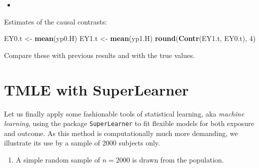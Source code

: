 \documentclass[
]{book}
\newenvironment{Shaded}{\begin{snugshade}}{\end{snugshade}}
\newcommand{\DecValTok}[1]{\textcolor[rgb]{0.00,0.00,0.81}{#1}}
\newcommand{\FunctionTok}[1]{\textcolor[rgb]{0.13,0.29,0.53}{\textbf{#1}}}
\newcommand{\NormalTok}[1]{#1}
\newcommand{\OtherTok}[1]{\textcolor[rgb]{0.56,0.35,0.01}{#1}}
\newcommand{\SpecialCharTok}[1]{\textcolor[rgb]{0.81,0.36,0.00}{\textbf{#1}}}
\providecommand{\tightlist}{%
  \setlength{\itemsep}{0pt}\setlength{\parskip}{0pt}}
\begin{document}
\begin{Shaded}
\end{Shaded}

\begin{itemize}
\tightlist
\item
\end{itemize}

Estimates of the causal contrasts:

\begin{Shaded}
\begin{Highlighting}[]
\NormalTok{EY0.t }\OtherTok{\textless{}{-}} \FunctionTok{mean}\NormalTok{(yp0.H)}
\NormalTok{EY1.t }\OtherTok{\textless{}{-}} \FunctionTok{mean}\NormalTok{(yp1.H)}
\FunctionTok{round}\NormalTok{(}\FunctionTok{Contr}\NormalTok{(EY1.t, EY0.t), }\DecValTok{4}\NormalTok{)}
\end{Highlighting}
\end{Shaded}

Compare these with previous results and with the true values.

\section{TMLE with SuperLearner}\label{tmle-with-superlearner}

Let us finally apply some
fashionable tools of statistical learning, aka \emph{machine learning},
using the package \texttt{SuperLearner} to fit flexible models
for both exposure and outcome.
As this method is computationally much
more demanding,
we illustrate its use by a sample of 2000 subjects only.

\begin{enumerate}
\def\labelenumi{\arabic{enumi}.}
\tightlist
\item
  A simple random sample of \(n=2000\) is drawn from the population.
\end{enumerate}
\end{document}
